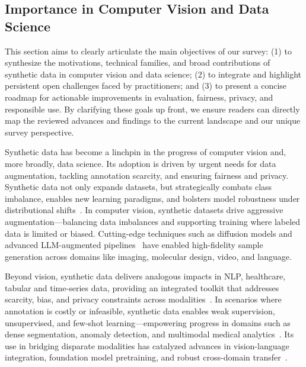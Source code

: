 \documentclass[sigconf]{acmart}
\begin{document}
\subsection{Importance in Computer Vision and Data Science}

This section aims to clearly articulate the main objectives of our survey: (1) to synthesize the motivations, technical families, and broad contributions of synthetic data in computer vision and data science; (2) to integrate and highlight persistent open challenges faced by practitioners; and (3) to present a concise roadmap for actionable improvements in evaluation, fairness, privacy, and responsible use. By clarifying these goals up front, we ensure readers can directly map the reviewed advances and findings to the current landscape and our unique survey perspective.

Synthetic data has become a linchpin in the progress of computer vision and, more broadly, data science. Its adoption is driven by urgent needs for data augmentation, tackling annotation scarcity, and ensuring fairness and privacy. Synthetic data not only expands datasets, but strategically combats class imbalance, enables new learning paradigms, and bolsters model robustness under distributional shifts~\cite{ref5,ref6,ref10,ref13,ref14,ref15,ref16,ref17,ref18,ref19,ref21,ref22,ref24,ref25,ref26,ref27,ref28,ref30,ref31,ref32,ref34,ref41,ref43,ref45,ref51,ref52,ref53,ref54,ref55,ref59,ref61,ref62,ref63,ref64,ref65,ref74,ref75,ref81,ref82,ref89,ref90}. In computer vision, synthetic datasets drive aggressive augmentation---balancing data imbalances and supporting training where labeled data is limited or biased. Cutting-edge techniques such as diffusion models and advanced LLM-augmented pipelines~\cite{ref10,ref14,ref15,ref16,ref17,ref18,ref19,ref24,ref25,ref26,ref74,ref81,ref89} have enabled high-fidelity sample generation across domains like imaging, molecular design, video, and language.

Beyond vision, synthetic data delivers analogous impacts in NLP, healthcare, tabular and time-series data, providing an integrated toolkit that addresses scarcity, bias, and privacy constraints across modalities~\cite{ref12,ref13,ref62,ref64,ref81}. In scenarios where annotation is costly or infeasible, synthetic data enables weak supervision, unsupervised, and few-shot learning---empowering progress in domains such as dense segmentation, anomaly detection, and multimodal medical analytics~\cite{ref12,ref23,ref24,ref26,ref31,ref32,ref51,ref53,ref54,ref55,ref59,ref74,ref81,ref89}. Its use in bridging disparate modalities has catalyzed advances in vision-language integration, foundation model pretraining, and robust cross-domain transfer~\cite{ref14,ref18,ref24,ref64,ref81,ref89,ref90}.
\end{document}
